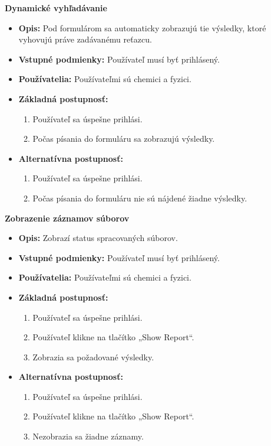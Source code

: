 \documentclass[12pt,a4paper]{article}
\begin{document}
\begin{enumerate}[label={[UC-\arabic*]}]
	\item {\bf Dynamické vyhľadávanie}
	\begin{itemize}
		\item{\bf Opis: } Pod formulárom sa automaticky zobrazujú tie výsledky, ktoré vyhovujú práve zadávanému reťazcu.
		\item{\bf Vstupné podmienky: } Používateľ musí byť prihlásený.
		\item{\bf Používatelia: } Používateľmi sú chemici a fyzici.
		\item{\bf Základná postupnosť: }
		\begin{enumerate}[label={\arabic*.}]
			\item Používateľ sa úspešne prihlási.
			\item Počas písania do formuláru sa zobrazujú výsledky.
		\end{enumerate}
		\item{\bf Alternatívna postupnosť: }
		\begin{enumerate}[label={\arabic*.}]
			\item Používateľ sa úspešne prihlási.
			\item Počas písania do formuláru nie sú nájdené žiadne výsledky.
		\end{enumerate}
	\end{itemize}
	\item {\bf Zobrazenie záznamov súborov}
	\begin{itemize}
		\item{\bf Opis: } Zobrazí status spracovaných súborov.
		\item{\bf Vstupné podmienky: } Používateľ musí byť prihlásený.
		\item{\bf Používatelia: } Používateľmi sú chemici a fyzici.
		\item{\bf Základná postupnosť: }
		\begin{enumerate}[label={\arabic*.}]
			\item Používateľ sa úspešne prihlási.
			\item Používateľ klikne na tlačítko „Show Report“.
			\item Zobrazia sa požadované výsledky.
		\end{enumerate}
		\item{\bf Alternatívna postupnosť: }
		\begin{enumerate}[label={\arabic*.}]
			\item Používateľ sa úspešne prihlási.
			\item Používateľ klikne na tlačítko „Show Report“.
			\item Nezobrazia sa žiadne záznamy.

\end{enumerate}
\end{itemize}
\end{enumerate}
\end{document}
